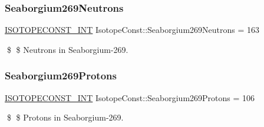 \subsubsection{\texorpdfstring{Seaborgium269\+Neutrons}{Seaborgium269Neutrons}}
{\footnotesize\ttfamily \mbox{\hyperlink{group___isotope_const-_macros_ga5f18360b3e99483a35c32d789e62621c}{I\+S\+O\+T\+O\+P\+E\+C\+O\+N\+S\+T\+\_\+\+I\+NT}} Isotope\+Const\+::\+Seaborgium269\+Neutrons = 163}

\$ \$ Neutrons in Seaborgium-\/269. \mbox{\label{group___isotope_const-_seaborgium-_sg269_ga19951cae59369357dac39bec1469ffd2}} 
\subsubsection{\texorpdfstring{Seaborgium269\+Protons}{Seaborgium269Protons}}
{\footnotesize\ttfamily \mbox{\hyperlink{group___isotope_const-_macros_ga5f18360b3e99483a35c32d789e62621c}{I\+S\+O\+T\+O\+P\+E\+C\+O\+N\+S\+T\+\_\+\+I\+NT}} Isotope\+Const\+::\+Seaborgium269\+Protons = 106}

\$ \$ Protons in Seaborgium-\/269. 